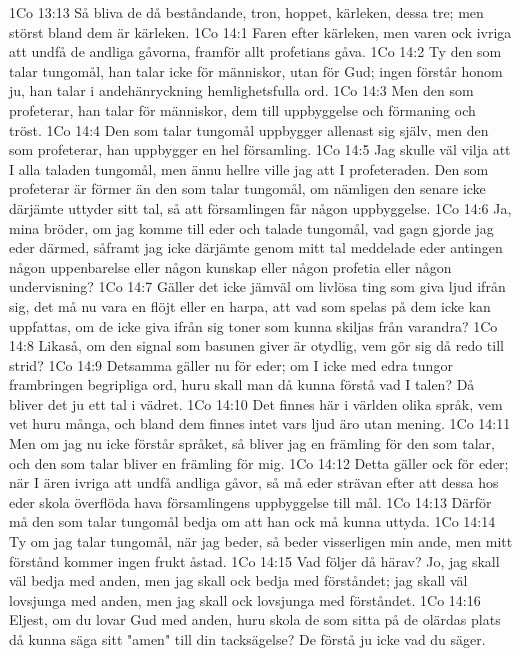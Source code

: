 1Co 13:13  Så bliva de då beståndande, tron, hoppet, kärleken, dessa tre; men störst bland dem är kärleken.
1Co 14:1  Faren efter kärleken, men varen ock ivriga att undfå de andliga gåvorna, framför allt profetians gåva.
1Co 14:2  Ty den som talar tungomål, han talar icke för människor, utan för Gud; ingen förstår honom ju, han talar i andehänryckning hemlighetsfulla ord.
1Co 14:3  Men den som profeterar, han talar för människor, dem till uppbyggelse och förmaning och tröst.
1Co 14:4  Den som talar tungomål uppbygger allenast sig själv, men den som profeterar, han uppbygger en hel församling.
1Co 14:5  Jag skulle väl vilja att I alla taladen tungomål, men ännu hellre ville jag att I profeteraden. Den som profeterar är förmer än den som talar tungomål, om nämligen den senare icke därjämte uttyder sitt tal, så att församlingen får någon uppbyggelse.
1Co 14:6  Ja, mina bröder, om jag komme till eder och talade tungomål, vad gagn gjorde jag eder därmed, såframt jag icke därjämte genom mitt tal meddelade eder antingen någon uppenbarelse eller någon kunskap eller någon profetia eller någon undervisning?
1Co 14:7  Gäller det icke jämväl om livlösa ting som giva ljud ifrån sig, det må nu vara en flöjt eller en harpa, att vad som spelas på dem icke kan uppfattas, om de icke giva ifrån sig toner som kunna skiljas från varandra?
1Co 14:8  Likaså, om den signal som basunen giver är otydlig, vem gör sig då redo till strid?
1Co 14:9  Detsamma gäller nu för eder; om I icke med edra tungor frambringen begripliga ord, huru skall man då kunna förstå vad I talen? Då bliver det ju ett tal i vädret.
1Co 14:10  Det finnes här i världen olika språk, vem vet huru många, och bland dem finnes intet vars ljud äro utan mening.
1Co 14:11  Men om jag nu icke förstår språket, så bliver jag en främling för den som talar, och den som talar bliver en främling för mig.
1Co 14:12  Detta gäller ock för eder; när I ären ivriga att undfå andliga gåvor, så må eder strävan efter att dessa hos eder skola överflöda hava församlingens uppbyggelse till mål.
1Co 14:13  Därför må den som talar tungomål bedja om att han ock må kunna uttyda.
1Co 14:14  Ty om jag talar tungomål, när jag beder, så beder visserligen min ande, men mitt förstånd kommer ingen frukt åstad.
1Co 14:15  Vad följer då härav? Jo, jag skall väl bedja med anden, men jag skall ock bedja med förståndet; jag skall väl lovsjunga med anden, men jag skall ock lovsjunga med förståndet.
1Co 14:16  Eljest, om du lovar Gud med anden, huru skola de som sitta på de olärdas plats då kunna säga sitt "amen" till din tacksägelse? De förstå ju icke vad du säger.
